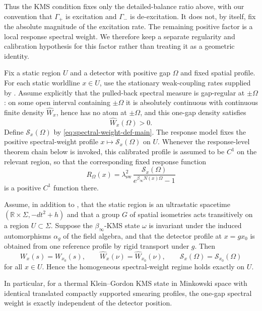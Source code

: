 Thus the KMS condition fixes only the detailed-balance ratio above, with our
convention that $\Gamma_+$ is excitation and $\Gamma_-$ is de-excitation. It
does not, by itself, fix the absolute magnitude of the excitation rate. The
remaining positive factor is a local response spectral weight. We therefore
keep a separate regularity and calibration hypothesis for this factor rather
than treating it as a geometric identity.

\begin{assumption}\label{ass:kms-response-main}
Fix a static region $U$ and a detector with positive gap $\Omega$ and fixed spatial profile. For each static worldline $x\in U$, use the stationary weak-coupling rates supplied by . Assume explicitly that the pulled-back spectral measure is gap-regular at $\pm\Omega$: on some open interval containing $\pm\Omega$ it is absolutely continuous with continuous finite density $\widehat W_x$, hence has no atom at $\pm\Omega$, and this one-gap density satisfies
\[
\widehat W_x(\Omega)>0.
\]
Define $\mathcal S_x(\Omega)$ by \eqref{eq:spectral-weight-def-main}. The
response model fixes the positive spectral-weight profile
$x\mapsto\mathcal S_x(\Omega)$ on $U$. Whenever the response-level theorem
chain below is invoked, this calibrated profile is assumed to be $C^1$ on the
relevant region, so that the corresponding fixed response function
\[
R_\Omega(x)=
\lambda_{\mathrm{sw}}^2\,
\frac{\mathcal S_x(\Omega)}{e^{\beta_\infty N(x)\Omega}-1}
\]
is a positive $C^1$ function there.
\end{assumption}

\begin{proposition}\label{prop:symmetry-homogeneous-main}
Assume, in addition to , that the static region is an ultrastatic spacetime $(\mathbb R\times\Sigma,-dt^2+h)$ and that a group $G$ of spatial isometries acts transitively on a region $U\subset\Sigma$. Suppose the $\beta_\infty$-KMS state $\omega$ is invariant under the induced automorphisms $\alpha_g$ of the field algebra, and that the detector profile at $x=gx_0$ is obtained from one reference profile by rigid transport under $g$. Then
\[
W_x(s)=W_{x_0}(s),\qquad
\widehat W_x(\nu)=\widehat W_{x_0}(\nu),\qquad
\mathcal S_x(\Omega)=\mathcal S_{x_0}(\Omega)
\]
for all $x\in U$. Hence the homogeneous spectral-weight regime holds exactly on $U$.

In particular, for a thermal Klein--Gordon KMS state in Minkowski space with identical translated compactly supported smearing profiles, the one-gap spectral weight is exactly independent of the detector position.
\end{proposition}

